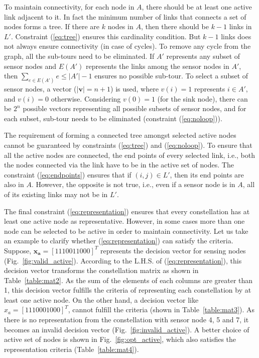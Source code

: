 \documentclass[conference]{IEEEtran}
\begin{document}
To maintain connectivity, for each node in $A$, there should be at least one active link adjacent to it. In fact the minimum number of links that connects a set of nodes forms a tree. If there are $k$ nodes in $A$, then there should be $k-1$ links in $L'$. Constraint (\ref{eq:tree}) ensures this cardinality condition. But $k-1$ links does not always ensure connectivity (in case of cycles). To remove any cycle from the graph, all the sub-tours need to be eliminated. If $A'$ represents any subset of sensor nodes and $E(A')$ represents the links among the sensor nodes in $A'$, then $\sum_{e\in E(A')} e \leq |A'| - 1$ ensures no possible sub-tour. To select a subset of sensor nodes, a vector ($|\boldsymbol{v}|=n+1$) is used, where $v(i)=1$ represents $i\in A'$, and $v(i)=0$ otherwise. Considering $v(0)=1$ (for the sink node), there can be $2^n$ possible vectors representing all possible subsets of sensor nodes, and for each subset, sub-tour needs to be eliminated (constraint (\ref{eq:noloop})).

The requirement of forming a connected tree amongst selected active nodes cannot be guaranteed by constraints (\ref{eq:tree}) and (\ref{eq:noloop}). To ensure that all the active nodes are connected, the end points of every selected link, i.e., both the nodes connected via the link have to be in the active set of nodes. The constraint (\ref{eq:endpoints}) ensures that if $(i,j) \in L'$, then its end points are also in $A$. However, the opposite is not true, i.e., even if a sensor node is in $A$, all of its existing links may not be in $L'$.  

The final constraint (\ref{eq:representation}) ensures that every constellation has at least one active node as representative. However, in some cases more than one node can be selected to be active in order to maintain connectivity. Let us take an example to clarify whether (\ref{eq:representation}) can satisfy the criteria. Suppose, $\boldsymbol{x_{a}}=[1110011000]^{T}$ represents the decision vector for sensing nodes (Fig.~\ref{fig:valid_active}). According to the L.H.S. of (\ref{eq:representation}), this decision vector transforms the constellation matrix as shown in Table~\ref{table:mat2}. As the sum of the elements of each columns are greater than 1, this decision vector fulfills the criteria of representing each constellation by at least one active node. On the other hand, a decision vector like $x_{a}=[1110001000]^{T}$, cannot fulfill the criteria (shown in Table~\ref{table:mat3}). As there is no representation from the constellation with sensor node 4, 5 and 7, it becomes an invalid decision vector (Fig.~\ref{fig:invalid_active}). A better choice of active set of nodes is shown in Fig.~\ref{fig:opt_active}, which also satisfies the representation criteria (Table~\ref{table:mat4}). 
\end{document}
